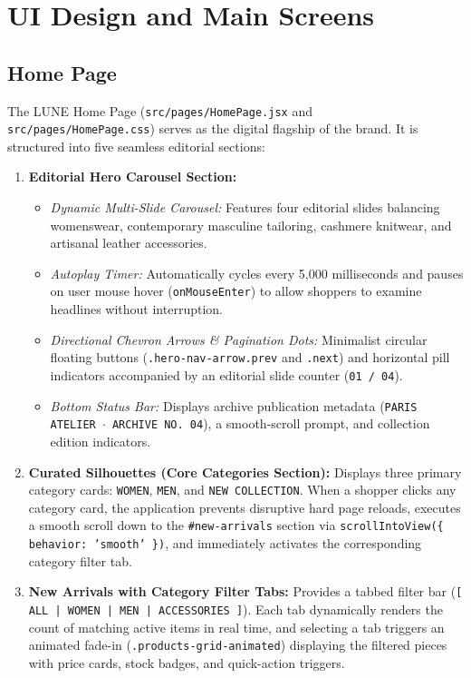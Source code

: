 \documentclass[12pt,a4paper,oneside]{report}
\begin{document}
\section{UI Design and Main Screens}

\subsection{Home Page}
The LUNE Home Page (\texttt{src/pages/HomePage.jsx} and \texttt{src/pages/HomePage.css}) serves as the digital flagship of the brand. It is structured into five seamless editorial sections:
\begin{enumerate}[leftmargin=1.2cm]
    \item \textbf{Editorial Hero Carousel Section:}
    \begin{itemize}[nosep]
        \item \textit{Dynamic Multi-Slide Carousel:} Features four editorial slides balancing womenswear, contemporary masculine tailoring, cashmere knitwear, and artisanal leather accessories.
        \item \textit{Autoplay Timer:} Automatically cycles every 5,000 milliseconds and pauses on user mouse hover (\texttt{onMouseEnter}) to allow shoppers to examine headlines without interruption.
        \item \textit{Directional Chevron Arrows \& Pagination Dots:} Minimalist circular floating buttons (\texttt{.hero-nav-arrow.prev} and \texttt{.next}) and horizontal pill indicators accompanied by an editorial slide counter (\texttt{01 / 04}).
        \item \textit{Bottom Status Bar:} Displays archive publication metadata (\texttt{PARIS ATELIER $\cdot$ ARCHIVE NO. 04}), a smooth-scroll prompt, and collection edition indicators.
    \end{itemize}
    \item \textbf{Curated Silhouettes (Core Categories Section):}
    Displays three primary category cards: \texttt{WOMEN}, \texttt{MEN}, and \texttt{NEW COLLECTION}. When a shopper clicks any category card, the application prevents disruptive hard page reloads, executes a smooth scroll down to the \texttt{\#new-arrivals} section via \texttt{scrollIntoView(\{ behavior: 'smooth' \})}, and immediately activates the corresponding category filter tab.
    \item \textbf{New Arrivals with Category Filter Tabs:}
    Provides a tabbed filter bar (\texttt{[ ALL | WOMEN | MEN | ACCESSORIES ]}). Each tab dynamically renders the count of matching active items in real time, and selecting a tab triggers an animated fade-in (\texttt{.products-grid-animated}) displaying the filtered pieces with price cards, stock badges, and quick-action triggers.

\end{enumerate}
\end{document}
